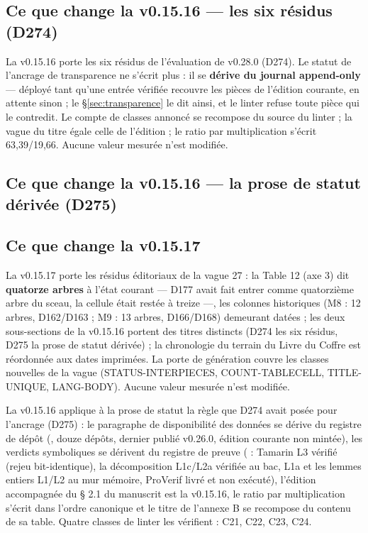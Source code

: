 \subsection{Ce que change la v0.15.16 — les six résidus (D274)}\label{sec:nouveautes1514}

La v0.15.16 porte les six résidus de l'évaluation de v0.28.0 (D274). Le statut de l'ancrage de
transparence ne s'écrit plus : il se \textbf{dérive du journal append-only} — déployé tant qu'une
entrée vérifiée recouvre les pièces de l'édition courante, en attente sinon ; le §\ref{sec:transparence}
le dit ainsi, et le linter refuse toute pièce qui le contredit. Le compte de classes annoncé se
recompose du source du linter ; la vague du titre égale celle de l'édition ; le ratio par
multiplication s'écrit 63,39/19,66. Aucune valeur mesurée n'est modifiée.


\subsection{Ce que change la v0.15.16 — la prose de statut dérivée (D275)}\label{sec:nouveautes1515}

\subsection{Ce que change la v0.15.17}\label{sec:nouveautes1517}

La v0.15.17 porte les résidus éditoriaux de la vague 27 : la Table 12 (axe 3) dit
\textbf{quatorze arbres} à l'état courant — D177 avait fait entrer  comme
quatorzième arbre du sceau, la cellule était restée à treize —, les colonnes historiques
(M8 : 12 arbres, D162/D163 ; M9 : 13 arbres, D166/D168) demeurant datées ; les deux
sous-sections de la v0.15.16 portent des titres distincts (D274 les six résidus,
D275 la prose de statut dérivée) ; la chronologie du terrain du Livre du Coffre est
réordonnée aux dates imprimées. La porte de génération couvre les classes nouvelles
de la vague (STATUS-INTERPIECES, COUNT-TABLECELL, TITLE-UNIQUE, LANG-BODY). Aucune
valeur mesurée n'est modifiée.

La v0.15.16 applique à la prose de statut la règle que D274 avait posée pour l'ancrage (D275) : le
paragraphe de disponibilité des données se dérive du registre de dépôt (, douze
dépôts, dernier publié v0.26.0, édition courante non mintée), les verdicts symboliques se dérivent
du registre de preuve ( : Tamarin L3 vérifié (rejeu bit-identique), la décomposition L1c/L2a vérifiée au bac, L1a et les lemmes entiers L1/L2 au mur
mémoire, ProVerif livré et non exécuté), l'édition accompagnée du § 2.1 du manuscrit est la
v0.15.16, le ratio par multiplication s'écrit dans l'ordre canonique et le titre de l'annexe B se
recompose du contenu de sa table. Quatre classes de linter les vérifient : C21, C22, C23, C24.

